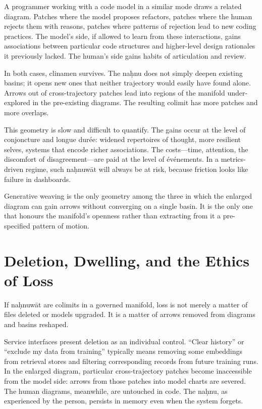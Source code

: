\documentclass[12pt,a4paper]{article}
\begin{document}
A programmer working with a code model in a similar mode draws a related diagram. Patches where the model proposes refactors, patches where the human rejects them with reasons, patches where patterns of rejection lead to new coding practices. The model's side, if allowed to learn from these interactions, gains associations between particular code structures and higher-level design rationales it previously lacked. The human's side gains habits of articulation and review.

In both cases, clinamen survives. The na\d{h}nu does not simply deepen existing basins; it opens new ones that neither trajectory would easily have found alone. Arrows out of cross-trajectory patches lead into regions of the manifold under-explored in the pre-existing diagrams. The resulting colimit has more patches and more overlaps.

This geometry is slow and difficult to quantify. The gains occur at the level of conjoncture and longue dur\'{e}e: widened repertoires of thought, more resilient selves, systems that encode richer associations. The costs---time, attention, the discomfort of disagreement---are paid at the level of \'{e}v\'{e}nements. In a metrics-driven regime, such na\d{h}nuw\={a}t will always be at risk, because friction looks like failure in dashboards.

Generative weaving is the only geometry among the three in which the enlarged diagram can gain arrows without converging on a single basin. It is the only one that honours the manifold's openness rather than extracting from it a pre-specified pattern of motion.

\section{Deletion, Dwelling, and the Ethics of Loss}

If na\d{h}nuw\={a}t are colimits in a governed manifold, loss is not merely a matter of files deleted or models upgraded. It is a matter of arrows removed from diagrams and basins reshaped.

Service interfaces present deletion as an individual control. ``Clear history'' or ``exclude my data from training'' typically means removing some embeddings from retrieval stores and filtering corresponding records from future training runs. In the enlarged diagram, particular cross-trajectory patches become inaccessible from the model side: arrows from those patches into model charts are severed. The human diagrams, meanwhile, are untouched in code. The na\d{h}nu, as experienced by the person, persists in memory even when the system forgets.
\end{document}
